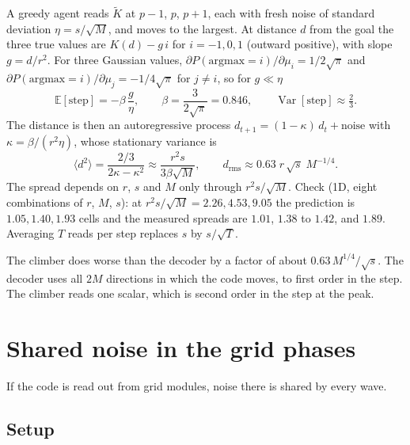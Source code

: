 \documentclass[11pt]{article}
\newcommand{\E}{\mathbb{E}}
\newcommand{\Var}{\operatorname{Var}}
\begin{document}
A greedy agent reads $\tilde K$ at $p-1$, $p$, $p+1$, each with fresh noise of standard deviation
$\eta = s/\sqrt{M}$, and moves to the largest. At distance $d$ from the goal the three true
values are $K(d) - g\,i$ for $i = -1, 0, 1$ (outward positive), with slope $g = d/r^2$. For three
Gaussian values, $\partial P(\text{argmax}=i)/\partial\mu_i = 1/2\sqrt{\pi}$ and
$\partial P(\text{argmax}=i)/\partial\mu_j = -1/4\sqrt{\pi}$ for $j\ne i$, so for $g \ll \eta$
\begin{equation}
  \E[\text{step}] = -\beta\,\frac{g}{\eta}, \qquad \beta = \frac{3}{2\sqrt{\pi}} = 0.846,
  \qquad \Var[\text{step}] \approx \tfrac23 .
\end{equation}
The distance is then an autoregressive process $d_{t+1} = (1-\kappa)\,d_t + \text{noise}$ with
$\kappa = \beta/(r^2\eta)$, whose stationary variance is
\begin{equation}
  \langle d^2\rangle = \frac{2/3}{2\kappa - \kappa^2}
  \approx \frac{r^2 s}{3\beta\sqrt{M}}, \qquad
  d_{\text{rms}} \approx 0.63\; r\,\sqrt{s}\;M^{-1/4} .
\end{equation}
The spread depends on $r$, $s$ and $M$ only through $r^2 s/\sqrt{M}$. Check (1D, eight
combinations of $r$, $M$, $s$): at $r^2 s/\sqrt{M} = 2.26, 4.53, 9.05$ the prediction is $1.05,
1.40, 1.93$ cells and the measured spreads are $1.01$, $1.38$ to $1.42$, and $1.89$. Averaging
$T$ reads per step replaces $s$ by $s/\sqrt{T}$.

The climber does worse than the decoder by a factor of about $0.63\,M^{1/4}/\sqrt{s}$. The decoder
uses all $2M$ directions in which the code moves, to first order in the step. The climber reads
one scalar, which is second order in the step at the peak.

\section{Shared noise in the grid phases}

If the code is read out from grid modules, noise there is shared by every wave.

\subsection{Setup}
\end{document}
